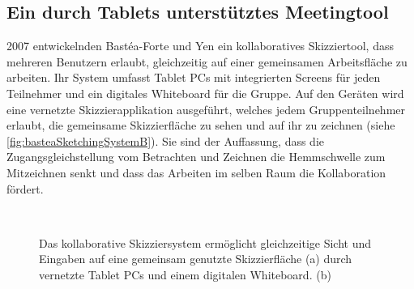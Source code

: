 \subsection{Ein durch Tablets unterstütztes Meetingtool}
2007 entwickelnden Bastéa-Forte und Yen ein kollaboratives Skizziertool, dass mehreren Benutzern erlaubt, gleichzeitig auf einer gemeinsamen Arbeitsfläche zu arbeiten. Ihr System umfasst Tablet PCs mit integrierten Screens für jeden Teilnehmer und ein digitales Whiteboard für die Gruppe. Auf den Geräten wird eine vernetzte Skizzierapplikation ausgeführt, welches jedem Gruppenteilnehmer erlaubt, die gemeinsame Skizzierfläche zu sehen und auf ihr zu zeichnen (siehe \autoref{fig:basteaSketchingSystemB}). Sie sind der Auffassung, dass die Zugangsgleichstellung vom Betrachten und Zeichnen die Hemmschwelle zum Mitzeichnen senkt und dass das Arbeiten im selben Raum die Kollaboration fördert. 

\begin{figure}
        \myfloatalign
         \quad
         \\
        \caption[Das kollaborative Skizziersystem \newline \citep{Bastea-Forte:2007}]{Das kollaborative Skizziersystem ermöglicht gleichzeitige Sicht und Eingaben auf eine gemeinsam genutzte Skizzierfläche (a) durch vernetzte Tablet PCs und einem digitalen Whiteboard. (b) }\label{fig:basteaSketchingSystemB}
\end{figure}

